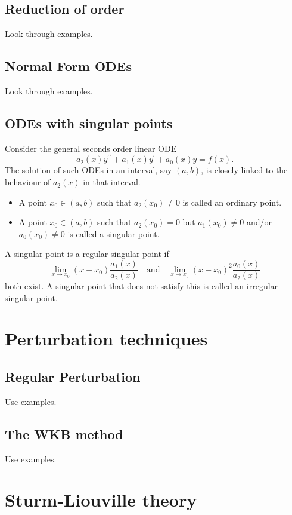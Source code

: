 \documentclass{article}
\begin{document}
\subsection{Reduction of order}
Look through examples.

\subsection{Normal Form ODEs}
Look through examples.

\subsection{ODEs with singular points}
Consider the general seconds order linear ODE
\begin{equation}
    a_2(x)y^{\prime\prime}+a_1(x)y^\prime + a_0(x)y = f(x).
\end{equation}
The solution of such ODEs in an interval, say $(a,b)$, is closely linked to the behaviour of $a_2(x)$ in that interval.
\begin{itemize}
    \item A point $x_0\in(a,b)$ such that $a_2(x_0)\neq 0$ is called an ordinary point.
    \item A point $x_0\in(a,b)$ such that $a_2(x_0) = 0$ but $a_1(x_0)\neq 0$ and/or $a_0(x_0)\neq 0$ is called a singular point.
\end{itemize}
A singular point is a regular singular point if
\begin{equation}
    \lim_{x\to x_0}(x-x_0)\frac{a_1(x)}{a_2(x)}\quad \text{and}\quad \lim_{x\to x_0}(x-x_0)^2\frac{a_0(x)}{a_2(x)}
\end{equation}
both exist. A singular point that does not satisfy this is called an irregular singular point.

\section{Perturbation techniques}
\subsection{Regular Perturbation}
Use examples.

\subsection{The WKB method}
Use examples.

\section{Sturm-Liouville theory}
\end{document}
